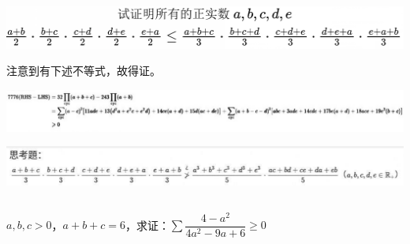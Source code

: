 \documentclass[UTF8]{ctexart}
\begin{document}
\subsection{}
\begin{center}
	\includegraphics[width=1\linewidth]{a21}
\end{center}
注意到有下述不等式，故得证。
\begin{center}
	\includegraphics[width=1\linewidth]{a22}
\end{center}
\begin{center}
	\includegraphics[width=1\linewidth]{a23}
\end{center}
\subsection{}
$ a,b,c> 0 $，$ a+b+c=6 $，求证：$ \displaystyle \sum \dfrac{4-a^{2}}{4a^{2}-9a+6}\geq 0$
\end{document}
